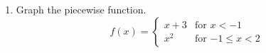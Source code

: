 \documentclass[11pt]{article}
\begin{document}
\begin{enumerate}


\newpage



\item Graph the piecewise function.
\[
  f(x) =
  \begin{cases}
                                   x+3 & \text{for $x<-1$} \\
                                   x^2 & \text{for $-1 \leq x <2$} 
  \end{cases}
\]



\end{enumerate}
\end{document}
